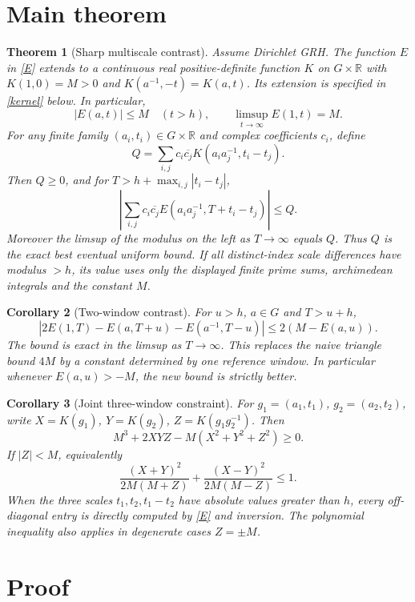 \documentclass[11pt]{article}
\newtheorem{theorem}{Theorem}
\newtheorem{corollary}[theorem]{Corollary}
\newcommand{\R}{\mathbb R}
\begin{document}
\section{Main theorem}
\begin{theorem}[Sharp multiscale contrast]\label{main}
Assume Dirichlet GRH. The function $E$ in \eqref{E} extends to a continuous real positive-definite function $K$ on $G\times\R$ with $K(1,0)=M>0$ and $K(a^{-1},-t)=K(a,t)$. Its extension is specified in \eqref{kernel} below. In particular,
\[
 |E(a,t)|\le M\quad(t>h),\qquad \limsup_{t\to\infty} E(1,t)=M.
\]
For any finite family $(a_i,t_i)\in G\times\R$ and complex coefficients $c_i$, define
\[
 Q=\sum_{i,j}c_i\overline{c_j}K(a_i a_j^{-1},t_i-t_j).
\]
Then $Q\ge0$, and for $T>h+\max_{i,j}|t_i-t_j|$,
\begin{equation}\label{bound}
 \left|\sum_{i,j}c_i\overline{c_j}E(a_i a_j^{-1},T+t_i-t_j)\right|\le Q.
\end{equation}
Moreover the limsup of the modulus on the left as $T\to\infty$ equals $Q$. Thus $Q$ is the exact best eventual uniform bound. If all distinct-index scale differences have modulus $>h$, its value uses only the displayed finite prime sums, archimedean integrals and the constant $M$.
\end{theorem}
\begin{corollary}[Two-window contrast]\label{contrast}
For $u>h$, $a\in G$ and $T>u+h$,
\begin{equation}\label{two}
 |2E(1,T)-E(a,T+u)-E(a^{-1},T-u)|\le 2(M-E(a,u)).
\end{equation}
The bound is exact in the limsup as $T\to\infty$. This replaces the naive triangle bound $4M$ by a constant determined by one reference window. In particular whenever $E(a,u)>-M$, the new bound is strictly better.
\end{corollary}
\begin{corollary}[Joint three-window constraint]\label{three}
For $g_1=(a_1,t_1)$, $g_2=(a_2,t_2)$, write $X=K(g_1)$, $Y=K(g_2)$, $Z=K(g_1g_2^{-1})$. Then
\[
 M^3+2XYZ-M(X^2+Y^2+Z^2)\ge0.
\]
If $|Z|<M$, equivalently
\[
 \frac{(X+Y)^2}{2M(M+Z)}+\frac{(X-Y)^2}{2M(M-Z)}\le1.
\]
When the three scales $t_1,t_2,t_1-t_2$ have absolute values greater than $h$, every off-diagonal entry is directly computed by \eqref{E} and inversion. The polynomial inequality also applies in degenerate cases $Z=\pm M$.
\end{corollary}

\section{Proof}
\end{document}
